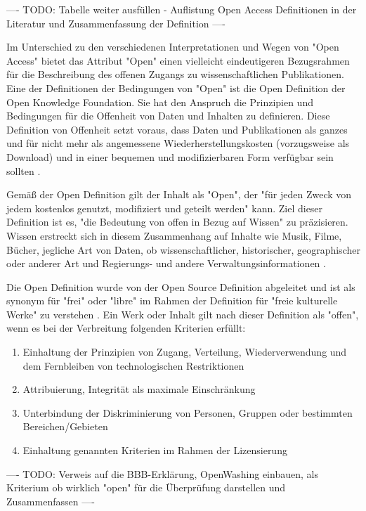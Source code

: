 ---- TODO: Tabelle weiter ausfüllen - Auflistung Open Access Definitionen in der Literatur und Zusammenfassung der Definition ----

Im Unterschied zu den verschiedenen Interpretationen und Wegen von "Open Access" bietet das Attribut "Open" einen vielleicht eindeutigeren Bezugsrahmen für die Beschreibung des offenen Zugangs zu wissenschaftlichen Publikationen. Eine der Definitionen der Bedingungen von "Open" ist die Open Definition der Open Knowledge Foundation. Sie hat den Anspruch die Prinzipien und Bedingungen für die Offenheit von Daten und Inhalten zu definieren. Diese Definition von Offenheit setzt voraus, dass Daten und Publikationen als ganzes und für nicht mehr als angemessene Wiederherstellungskosten (vorzugsweise als Download) und in einer bequemen und modifizierbaren Form verfügbar sein sollten \cite{Molloy_2011}.

Gemäß der Open Definition gilt der Inhalt als "Open", der "für jeden Zweck von jedem kostenlos genutzt, modifiziert und geteilt werden" \cite{open_definition} kann. Ziel dieser Definition ist es, "die Bedeutung von offen in Bezug auf Wissen" zu präzisieren. Wissen erstreckt sich in diesem Zusammenhang auf Inhalte wie Musik, Filme, Bücher, jegliche Art von Daten, ob wissenschaftlicher, historischer, geographischer oder anderer Art und Regierungs- und andere Verwaltungsinformationen \cite{open_definition}.

Die Open Definition wurde von der Open Source Definition abgeleitet und ist als synonym für "frei" oder "libre" im Rahmen der Definition für "freie kulturelle Werke" zu verstehen \cite{suchen}. Ein Werk oder Inhalt gilt nach dieser Definition als "offen", wenn es bei der Verbreitung folgenden Kriterien erfüllt:
\begin{enumerate}
\item Einhaltung der Prinzipien von Zugang, Verteilung, Wiederverwendung und dem Fernbleiben von technologischen Restriktionen
\item Attribuierung, Integrität als maximale Einschränkung
\item Unterbindung der Diskriminierung von Personen, Gruppen oder bestimmten Bereichen/Gebieten
\item Einhaltung genannten Kriterien  im Rahmen der Lizensierung
\end{enumerate}

---- TODO: Verweis auf die BBB-Erklärung, OpenWashing einbauen, als Kriterium ob wirklich "open" für die Überprüfung darstellen und Zusammenfassen ----

